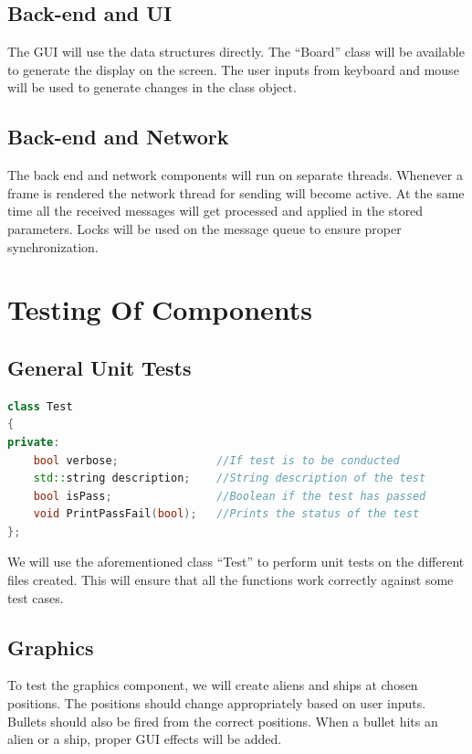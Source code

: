 \documentclass{article}
\begin{document}
			\subsection{Back-end and UI}
				The GUI will use the data structures directly. The ``Board'' class will be available to generate the display on the screen. The user inputs from keyboard and mouse will be used to generate changes in the class object. 
			\subsection{Back-end and Network}
				The back end and network components will run on separate threads. Whenever a frame is rendered the network thread for sending will become active. At the same time all the received messages will get processed and applied in the stored parameters. Locks will be used on the message queue to ensure proper synchronization.
	\section{Testing Of Components}
			\subsection{General Unit Tests}
				\begin{lstlisting}[language=C++, caption={Class Parameters for Test}]
class Test
{
private:
	bool verbose;               //If test is to be conducted
	std::string description;    //String description of the test
	bool isPass;                //Boolean if the test has passed 
	void PrintPassFail(bool);   //Prints the status of the test
};
				\end{lstlisting}

				We will use the aforementioned class ``Test'' to perform unit tests on the different files created. This will ensure that all the functions work correctly against some test cases.

			\subsection{Graphics}
				To test the graphics component, we will create aliens and ships at chosen positions. The positions should change appropriately based on user inputs. Bullets should also be fired from the correct positions. When a bullet hits an alien or a ship, proper GUI effects will be added.
\end{document}
